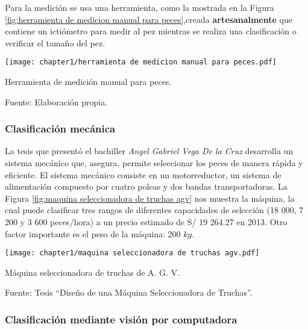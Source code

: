 Para la medición se usa una herramienta, como la mostrada en la Figura \ref{fig:herramienta de medicion manual para peces},creada \textbf{artesanalmente} que contiene un ictiómetro para medir al pez mientras se realiza una clasificación o verificar el tamaño del pez. 

\begin{myfigure}[H]
	\footnotesize\centering
	\texttt{[image: chapter1/herramienta de medicion manual para peces.pdf]}
	\caption{Herramienta de medición manual para peces.}
	\begin{myflushcenter}
		Fuente: Elaboración propia.
	\end{myflushcenter}			
	\label{fig:herramienta de medicion manual para peces}
\end{myfigure}

\subsubsection{Clasificación mecánica}

La tesis que presentó el bachiller \textit{Angel Gabriel Vega De la Cruz} desarrolla un sistema mecánico que, asegura, permite seleccionar los peces de manera rápida y eficiente. El sistema mecánico consiste en un motorreductor, un sistema de alimentación compuesto por cuatro poleas y dos bandas transportadoras. La Figura \ref{fig:maquina seleccionadora de truchas agv} nos muestra la máquina, la cual puede clasificar tres rangos de  diferentes capacidades de selección (18 000, 7 200 y 3 600 peces/hora) a un precio estimado de S/ 19 264.27 en 2013. Otro factor importante es el peso de la máquina: 200 $ kg $.\citep[p.~2,105]{Vega2013}

\begin{myfigure}[H]
	\footnotesize\centering
	\texttt{[image: chapter1/maquina seleccionadora de truchas agv.pdf]}
	\caption{Máquina seleccionadora de truchas de A. G. V.}
	\begin{myflushcenter}
		Fuente: Tesis “Diseño de una Máquina Seleccionadora de Truchas”.
	\end{myflushcenter}	
	\label{fig:maquina seleccionadora de truchas agv}
\end{myfigure}

\subsubsection{Clasificación mediante visión por computadora}

